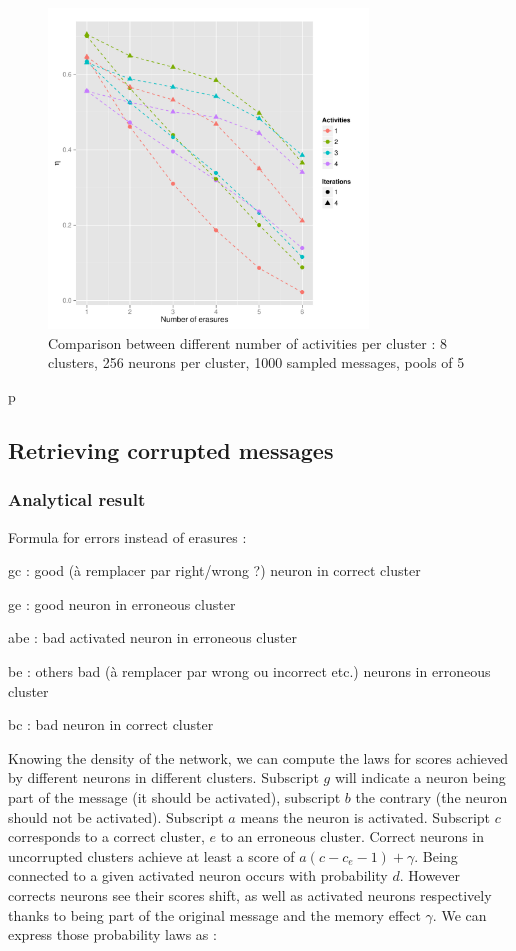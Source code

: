 \documentclass[english,11pt,twocolumn]{article}
\theoremstyle{definition}
\begin{document}
		
		
		\begin{figure}[!htb]
		\includegraphics[width=8.5cm]{Courbes/5portant_erasures_c8l256}
		\caption{Comparison between different number of activities per cluster :  8 clusters, 256 neurons per cluster, 1000 sampled messages, pools of 5}
	\end{figure}
	
	\newpage
	p
	\newpage
	$\,$
	\newpage
	
	\subsection{Retrieving corrupted messages}
	
	\subsubsection{Analytical result}	
	Formula for errors instead of erasures : 
	
	gc : good (à remplacer par right/wrong ?) neuron in correct cluster
	
	ge : good neuron in erroneous cluster
	
	abe : bad activated neuron in erroneous cluster
	
	be : others bad (à remplacer par wrong ou incorrect etc.) neurons in erroneous cluster
	
	bc : bad neuron in correct cluster
	
	Knowing the density of the network, we can compute the laws for scores achieved by different neurons in different clusters. Subscript $g$ will indicate a neuron being part of the message (it should be activated), subscript $b$ the contrary (the neuron should not be activated). Subscript $a$ means the neuron is activated. Subscript $c$ corresponds to a correct cluster, $e$ to an erroneous cluster.
	Correct neurons in uncorrupted clusters achieve at least a score of $a(c-c_e - 1) + \gamma$. 
	Being connected to a given activated neuron occurs with probability $d$. However corrects neurons see their scores shift, as well as activated neurons respectively thanks to being part of the original message and the memory effect $\gamma$. We can express those probability laws as : 
	
\end{document}
